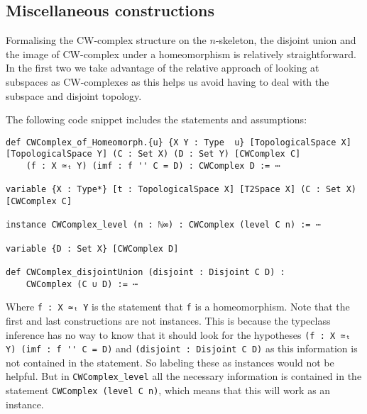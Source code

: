 \subsection{Miscellaneous constructions}

Formalising the CW-complex structure on the $n$-skeleton, the disjoint union and the image of CW-complex under a homeomorphism is relatively straightforward. 
In the first two we take advantage of the relative approach of looking at subspaces as CW-complexes as this helps us avoid having to deal with the subspace and disjoint topology. 

The following code snippet includes the statements and assumptions:

\begin{lstlisting}
def CWComplex_of_Homeomorph.{u} {X Y : Type  u} [TopologicalSpace X] [TopologicalSpace Y] (C : Set X) (D : Set Y) [CWComplex C] 
    (f : X ≃ₜ Y) (imf : f '' C = D) : CWComplex D := ⋯

variable {X : Type*} [t : TopologicalSpace X] [T2Space X] (C : Set X) [CWComplex C]

instance CWComplex_level (n : ℕ∞) : CWComplex (level C n) := ⋯

variable {D : Set X} [CWComplex D] 

def CWComplex_disjointUnion (disjoint : Disjoint C D) : 
    CWComplex (C ∪ D) := ⋯
\end{lstlisting}

Where \lstinline{f : X ≃ₜ Y} is the statement that \lstinline{f} is a homeomorphism. 
Note that the first and last constructions are not instances.
This is because the typeclass inference has no way to know that it should look for the hypotheses \lstinline{(f : X ≃ₜ Y) (imf : f '' C = D)} and \lstinline{(disjoint : Disjoint C D)} as this information is not contained in the statement. 
So labeling these as instances would not be helpful. 
But in \lstinline{CWComplex_level} all the necessary information is contained in the statement \lstinline{CWComplex (level C n)}, which means that this will work as an instance.